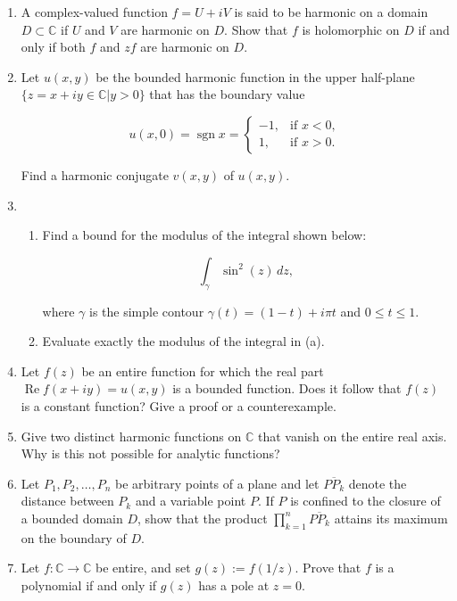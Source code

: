 \documentclass[a4paper,10pt]{article}
\renewcommand{\Re}{\operatorname{Re}}
\begin{document}
\begin{enumerate}
		\item  A complex-valued function $f=U+iV$ is said to be harmonic on a domain $D\subset\mathbb{C}$ if $U$ and $V$ are harmonic on $D$. Show that $f$ is holomorphic on $D$ if and only if both $f$ and $zf$ are harmonic on $D$.
		
		\item  Let $u(x,y)$ be the bounded harmonic function in the upper half-plane $\{z=x+iy\in \mathbb{C}|y>0\}$ that has the boundary value
		
		\[u(x,0)=\operatorname{sgn} x=\begin{cases} -1, & \text{if } x<0, \\ 1, & \text{if } x>0. \end{cases}\]
		
		Find a harmonic conjugate $v(x,y)$ of $u(x,y)$.
		
		\item
		\begin{enumerate} 
			\item Find a bound for the modulus of the integral shown below:
		
		\[\int_{\gamma}\sin^{2}(z)\,dz,\]
		
		where $\gamma$ is the simple contour $\gamma(t)=(1-t)+i\pi t$ and $0\le t\le1$.
		
		\item Evaluate exactly the modulus of the integral in (a).
		\end{enumerate}
		
		\item Let $f(z)$ be an entire function for which the real part $\Re f(x+iy)=u(x,y)$ is a bounded function.
		Does it follow that $f(z)$ is a constant function? Give a proof or a counterexample.
		
		\item Give two distinct harmonic functions on $\mathbb{C}$ that vanish on the entire real axis. Why is this not possible for analytic functions?
		
		\item Let $P_{1},P_{2},\ldots,P_{n}$ be arbitrary points of a plane and let $\overline{PP_{k}}$ denote the distance between $P_{k}$ and a variable point $P$. If $P$ is confined to the closure of a bounded domain $D$, show that the product $\prod_{k=1}^{n}\overline{PP_{k}}$ attains its maximum on the boundary of $D$.
		
		\item Let $f:\mathbb{C}\to\mathbb{C}$ be entire, and set $g(z):=f(1/z)$.
		Prove that $f$ is a polynomial if and only if $g(z)$ has a pole at $z=0$.
	\end{enumerate}
	
\end{document}
